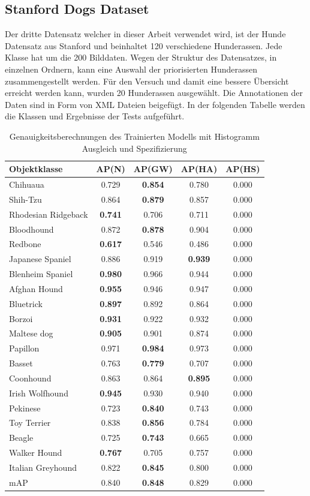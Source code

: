 \documentclass[a4paper,12pt,oneside]{article}
\begin{document}
  \subsection{Stanford Dogs Dataset}
Der dritte Datensatz welcher in dieser Arbeit verwendet wird, ist der Hunde Datensatz aus Stanford und beinhaltet 120 verschiedene Hunderassen. Jede Klasse hat um die 200 Bilddaten. Wegen der Struktur des Datensatzes, in einzelnen Ordnern, kann eine Auswahl der priorisierten Hunderassen zusammengestellt werden. Für den Versuch und damit eine bessere Übersicht erreicht werden kann, wurden 20 Hunderassen ausgewählt. Die Annotationen der Daten sind in Form von XML Dateien beigefügt. In der folgenden Tabelle werden die Klassen und Ergebnisse der Tests aufgeführt.
\begin{table}
[h]
\caption{Genauigkeitsberechnungen des Trainierten Modells mit Histogramm Ausgleich und Spezifizierung}
\centering
\begin{tabular}{|l|c|c|c|c|}
\hline
Objektklasse & AP(N) & AP(GW) & AP(HA) & AP(HS)\\
\hline
Chihuaua & 0.729 & \textbf{0.854} & 0.780 & 0.000\\ 
Shih-Tzu & 0.864 & \textbf{0.879} & 0.857 & 0.000\\
Rhodesian Ridgeback & \textbf{0.741} & 0.706 & 0.711 & 0.000\\
Bloodhound & 0.872 & \textbf{0.878} & 0.904 & 0.000\\
Redbone & \textbf{0.617} & 0.546 & 0.486 & 0.000\\ 
Japanese Spaniel & 0.886 & 0.919 & \textbf{0.939} & 0.000\\
Blenheim Spaniel & \textbf{0.980} & 0.966 & 0.944 & 0.000\\
Afghan Hound & \textbf{0.955} & 0.946 & 0.947 & 0.000\\
Bluetrick & \textbf{0.897} & 0.892 & 0.864 & 0.000\\ 
Borzoi & \textbf{0.931} & 0.922 & 0.932 & 0.000\\
Maltese dog & \textbf{0.905} & 0.901 & 0.874 & 0.000\\
Papillon & 0.971 & \textbf{0.984} & 0.973 & 0.000\\
Basset & 0.763 & \textbf{0.779} & 0.707 & 0.000\\
Coonhound & 0.863 & 0.864 & \textbf{0.895} & 0.000\\
Irish Wolfhound & \textbf{0.945} & 0.930 & 0.940 & 0.000\\
Pekinese & 0.723 & \textbf{0.840} & 0.743 & 0.000\\
Toy Terrier & 0.838 & \textbf{0.856} & 0.784 & 0.000\\
Beagle & 0.725 & \textbf{0.743} & 0.665 & 0.000\\
Walker Hound & \textbf{0.767} & 0.705 & 0.757 & 0.000\\
Italian Greyhound & 0.822 & \textbf{0.845} & 0.800 & 0.000\\
\hline
mAP & 0.840 & \textbf{0.848} & 0.829 & 0.000\\
\hline
\end{tabular}
\end{table}    
  \newpage
\end{document}
